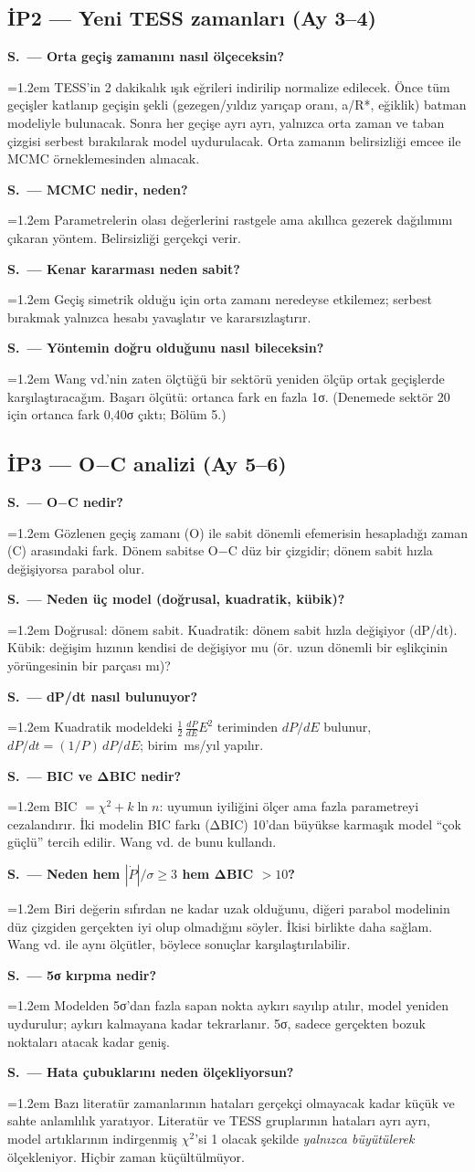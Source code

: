 \documentclass[11pt,a4paper]{article}
\newcounter{sor}[section]
\newcommand{\SC}[2]{\stepcounter{sor}\par\noindent\textbf{S\thesection.\thesor\ — #1}\par\nopagebreak
  \noindent\hangindent=1.2em\hangafter=0 #2\par\vspace{0.35em}}
\newcommand{\OC}{O$-$C}
\newcommand{\Pdot}{\ensuremath{\dot{P}}}
\newcommand{\msyil}{\,ms/yıl}
\begin{document}
\subsection{İP2 — Yeni TESS zamanları (Ay 3--4)}
\SC{Orta geçiş zamanını nasıl ölçeceksin?}{TESS'in 2 dakikalık ışık eğrileri indirilip normalize edilecek. Önce tüm geçişler katlanıp geçişin şekli (gezegen/yıldız yarıçap oranı, a/R*, eğiklik) batman modeliyle bulunacak. Sonra her geçişe ayrı ayrı, yalnızca orta zaman ve taban çizgisi serbest bırakılarak model uydurulacak. Orta zamanın belirsizliği emcee ile MCMC örneklemesinden alınacak.}
\SC{MCMC nedir, neden?}{Parametrelerin olası değerlerini rastgele ama akıllıca gezerek dağılımını çıkaran yöntem. Belirsizliği gerçekçi verir.}
\SC{Kenar kararması neden sabit?}{Geçiş simetrik olduğu için orta zamanı neredeyse etkilemez; serbest bırakmak yalnızca hesabı yavaşlatır ve kararsızlaştırır.}
\SC{Yöntemin doğru olduğunu nasıl bileceksin?}{Wang vd.'nin zaten ölçtüğü bir sektörü yeniden ölçüp ortak geçişlerde karşılaştıracağım. Başarı ölçütü: ortanca fark en fazla 1σ. (Denemede sektör 20 için ortanca fark 0,40σ çıktı; Bölüm 5.)}

\subsection{İP3 — \OC{} analizi (Ay 5--6)}
\SC{\OC{} nedir?}{Gözlenen geçiş zamanı (O) ile sabit dönemli efemerisin hesapladığı zaman (C) arasındaki fark. Dönem sabitse \OC{} düz bir çizgidir; dönem sabit hızla değişiyorsa parabol olur.}
\SC{Neden üç model (doğrusal, kuadratik, kübik)?}{Doğrusal: dönem sabit. Kuadratik: dönem sabit hızla değişiyor (dP/dt). Kübik: değişim hızının kendisi de değişiyor mu (ör. uzun dönemli bir eşlikçinin yörüngesinin bir parçası mı)?}
\SC{dP/dt nasıl bulunuyor?}{Kuadratik modeldeki $\tfrac12\,\tfrac{dP}{dE}E^2$ teriminden $dP/dE$ bulunur, $dP/dt = (1/P)\,dP/dE$; birim \msyil{} yapılır.}
\SC{BIC ve ΔBIC nedir?}{BIC $=\chi^2 + k\ln n$: uyumun iyiliğini ölçer ama fazla parametreyi cezalandırır. İki modelin BIC farkı (ΔBIC) 10'dan büyükse karmaşık model ``çok güçlü'' tercih edilir. Wang vd. de bunu kullandı.}
\SC{Neden hem $|\Pdot|/\sigma\geq3$ hem ΔBIC $>10$?}{Biri değerin sıfırdan ne kadar uzak olduğunu, diğeri parabol modelinin düz çizgiden gerçekten iyi olup olmadığını söyler. İkisi birlikte daha sağlam. Wang vd. ile aynı ölçütler, böylece sonuçlar karşılaştırılabilir.}
\SC{5σ kırpma nedir?}{Modelden 5σ'dan fazla sapan nokta aykırı sayılıp atılır, model yeniden uydurulur; aykırı kalmayana kadar tekrarlanır. 5σ, sadece gerçekten bozuk noktaları atacak kadar geniş.}
\SC{Hata çubuklarını neden ölçekliyorsun?}{Bazı literatür zamanlarının hataları gerçekçi olmayacak kadar küçük ve sahte anlamlılık yaratıyor. Literatür ve TESS gruplarının hataları ayrı ayrı, model artıklarının indirgenmiş $\chi^2$'si 1 olacak şekilde \emph{yalnızca büyütülerek} ölçekleniyor. Hiçbir zaman küçültülmüyor.}
\end{document}
